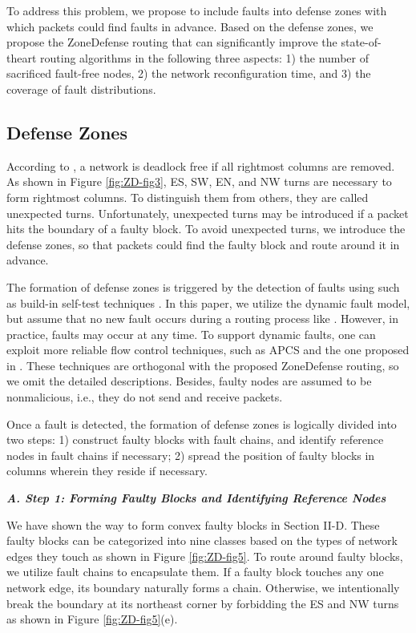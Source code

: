 To address this problem, we propose to include faults into defense zones with which packets could find faults in advance. Based on the defense zones, we propose the ZoneDefense routing that can significantly improve the state-of-theart routing algorithms \cite{glass1993fault} \cite{wu2003fault} \cite{zhang2008reconfigurable}in the following three aspects: 1) the number of sacrificed fault-free nodes, 2) the network reconfiguration time, and 3) the coverage of fault distributions.

\subsection{Defense Zones}
According to \cite{chiu2000odd}, a network is deadlock free if all rightmost columns are removed. As shown in Figure \ref{fig:ZD-fig3}, ES, SW, EN, and NW turns are necessary to form rightmost columns. To distinguish them from others, they are called unexpected turns. Unfortunately, unexpected turns may be introduced if a packet hits the boundary of a faulty block. To avoid unexpected turns, we introduce the defense zones, so that packets could find the faulty block and route around it in advance.

The formation of defense zones is triggered by the detection of faults using such as build-in self-test techniques \cite{li2001loop}. In this paper, we utilize the dynamic fault model, but assume that no new fault occurs during a routing process like \cite{wu2003fault}. However, in practice, faults may occur at any time. To support dynamic faults, one can exploit more reliable flow control techniques, such as APCS \cite{gaughan1996distributed} and the one proposed in \cite{dao1999dynamically}. These techniques are orthogonal with the proposed ZoneDefense routing, so we omit the detailed descriptions. Besides, faulty nodes are assumed to be nonmalicious, i.e., they do not send and receive packets.


Once a fault is detected, the formation of defense zones is logically divided into two steps:
1) construct faulty blocks with fault chains, and identify reference nodes in fault chains if necessary;
2) spread the position of faulty blocks in columns wherein they reside if necessary.


\textbf{\textit{A. Step 1: Forming Faulty Blocks and Identifying Reference
Nodes}}

We have shown the way to form convex faulty blocks in Section II-D. These faulty blocks can be categorized into nine classes based on the types of network edges they touch as shown in Figure \ref{fig:ZD-fig5}. To route around faulty blocks, we utilize fault chains to encapsulate them. If a faulty block touches any one network edge, its boundary naturally forms a chain. Otherwise, we intentionally break the boundary at its northeast corner by forbidding the ES and NW turns as shown in Figure \ref{fig:ZD-fig5}(e).


